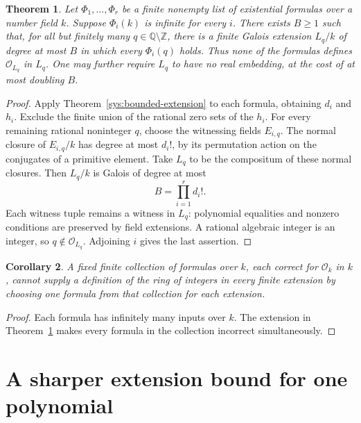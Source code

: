 \documentclass[11pt,a4paper]{article}
\newtheorem{theorem}{Theorem}[section]
\newtheorem{corollary}[theorem]{Corollary}
\theoremstyle{definition}\newtheorem{definition}[theorem]{Definition}
\theoremstyle{remark}\newtheorem{remark}[theorem]{Remark}
\newcommand{\Q}{\mathbb Q}\newcommand{\Z}{\mathbb Z}
\begin{document}
\begin{theorem}\label{thm:finite-menu}
Let $\Phi_1,\ldots,\Phi_r$ be a finite nonempty list of
existential formulas over a number field $k$. Suppose
$\Phi_i(k)$ is infinite for every $i$.
There exists $B\ge1$ such that, for all but finitely many
$q\in\Q\setminus\Z$, there is a finite Galois extension
$L_q/k$ of degree at most $B$ in which every $\Phi_i(q)$ holds.
Thus none of the formulas defines $\mathcal O_{L_q}$ in $L_q$.
One may further require $L_q$ to have no real embedding, at the
cost of at most doubling $B$.
\end{theorem}
\begin{proof}
Apply Theorem~\ref{sys:bounded-extension} to each formula, obtaining $d_i$
and $h_i$. Exclude the finite union of the rational zero sets
of the $h_i$. For every remaining rational noninteger $q$,
choose the witnessing fields $E_{i,q}$.
The normal closure of $E_{i,q}/k$ has degree at most $d_i!$,
by its permutation action on the conjugates of a primitive
element. Take $L_q$ to be the compositum of these normal closures.
Then $L_q/k$ is Galois of degree at most
\[
                              B=\prod_{i=1}^r d_i!.
\]
Each witness tuple remains a witness in $L_q$: polynomial
equalities and nonzero conditions are preserved by field
extensions. A rational algebraic integer is an integer, so
$q\notin\mathcal O_{L_q}$. Adjoining $i$ gives the last assertion.
\end{proof}

\begin{corollary}
A fixed finite collection of formulas over $k$, each correct for
$\mathcal O_k$ in $k$, cannot supply a definition of the ring of
integers in every finite extension by choosing one formula from
that collection for each extension.
\end{corollary}
\begin{proof}
Each formula has infinitely many inputs over $k$. The extension
in Theorem~\ref{thm:finite-menu} makes every formula in the
collection incorrect simultaneously.
\end{proof}

\section{A sharper extension bound for one polynomial}
\end{document}
